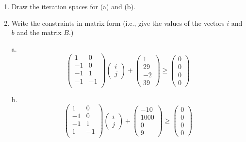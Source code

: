 \documentclass[11pt]{article}
\begin{document}
\begin{enumerate}
	\item Draw the iteration spaces for (a) and (b).
		\begin{Answer}
		\end{Answer}
	\item Write the constraints in matrix form (i.e., give the values of the vectors $i$ and $b$ and the matrix $B$.)
		\begin{Answer}
		a.
		$$
		\begin{pmatrix}
		1 & 0  \\
		-1 & 0  \\
		-1 & 1 \\
		-1 & -1 \\
		\end{pmatrix}
		\begin{pmatrix}
		i \\
		j 
		\end{pmatrix}
		+
		\begin{pmatrix}
		1 \\
		29 \\
		-2 \\
		39
		\end{pmatrix}
		\ge
		\begin{pmatrix}
		0 \\
		0 \\
		0 \\
		0
		\end{pmatrix}
		$$
		
		b.
		$$
		\begin{pmatrix}
		1 & 0  \\
		-1 & 0  \\
		-1 & 1 \\
		1 & -1 \\
		\end{pmatrix}
		\begin{pmatrix}
		i \\
		j 
		\end{pmatrix}
		+
		\begin{pmatrix}
		-10 \\
		1000 \\
		0 \\
		9
		\end{pmatrix}
		\ge
		\begin{pmatrix}
		0 \\
		0 \\
		0 \\
		0
		\end{pmatrix}
		$$
		

\end{Answer}
\end{enumerate}
\end{document}
